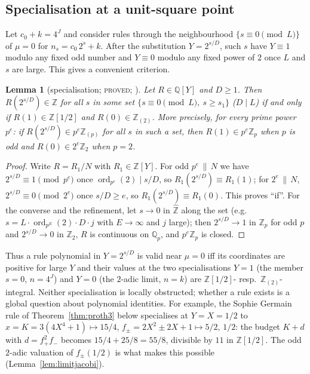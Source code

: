 \documentclass[11pt,reqno]{amsart}
\newtheorem{lemma}[theorem]{Lemma}
\theoremstyle{definition}
\newcommand{\Z}{\mathbb Z}
\newcommand{\Q}{\mathbb Q}
\newcommand{\Zh}{\widehat{\Z}}
\newcommand{\ord}{\operatorname{ord}}
\newcommand{\status}[1]{\textup{\textsc{#1}}}
\begin{document}
\subsection{Specialisation at a unit-square point}
Let $c_0+k=4^J$ and consider rules through the neighbourhood
$\{s\equiv0\pmod L\}$ of $\mu=0$ for $n_s=c_0\,2^s+k$.  After the
substitution $Y=2^{s/D}$, such $s$ have $Y\equiv1$ modulo any fixed odd
number and $Y\equiv0$ modulo any fixed power of $2$ once $L$ and $s$ are
large.  This gives a convenient criterion.

\begin{lemma}[specialisation; \status{proved}; {\cite[Lemma~2.1]{MenuLadder}}]\label{lem:special}
Let $R\in\Q[Y]$ and $D\ge1$.  Then $R(2^{s/D})\in\Z$ for all $s$ in some set
$\{s\equiv0\pmod L,\ s\ge s_1\}$ \textup{(}$D\mid L$\textup{)} if and only if
$R(1)\in\Z[1/2]$ and $R(0)\in\Z_{(2)}$.  More precisely, for every prime
power $p^e$: if $R(2^{s/D})\in p^e\Z_{(p)}$ for all $s$ in such a set, then
$R(1)\in p^e\Z_p$ when $p$ is odd and $R(0)\in 2^e\Z_2$ when $p=2$.
\end{lemma}

\begin{proof}
Write $R=R_1/N$ with $R_1\in\Z[Y]$.  For odd $p^e\,\|\,N$ we have
$2^{s/D}\equiv1\pmod{p^e}$ once $\ord_{p^e}(2)\mid s/D$, so
$R_1(2^{s/D})\equiv R_1(1)$; for $2^e\,\|\,N$, $2^{s/D}\equiv0\pmod{2^e}$ once
$s/D\ge e$, so $R_1(2^{s/D})\equiv R_1(0)$.  This proves ``if''.  For the
converse and the refinement, let $s\to0$ in $\Zh$ along the set (e.g.\
$s=L\cdot\ord_{p^E}(2)\cdot D\cdot j$ with $E\to\infty$ and $j$ large); then
$2^{s/D}\to1$ in $\Z_p$ for odd $p$ and $2^{s/D}\to0$ in $\Z_2$, $R$ is
continuous on $\Q_p$, and $p^e\Z_p$ is closed.
\end{proof}

Thus a rule polynomial in $Y=2^{s/D}$ is valid near $\mu=0$ iff its
coordinates are positive for large $Y$ and their values at the two
specialisations $Y=1$ (the member $s=0$, $n=4^J$) and $Y=0$ (the
$2$-adic limit, $n=k$) are $\Z[1/2]$- resp.\ $\Z_{(2)}$-integral.  Neither
specialisation is locally obstructed; whether a rule exists is a global
question about polynomial identities.  For example, the Sophie Germain
rule of Theorem~\ref{thm:proth3} below specialises at $Y=X=1/2$ to
$x=K=3(4X^4+1)\mapsto 15/4$, $f_\pm=2X^2\pm2X+1\mapsto 5/2,\,1/2$: the
budget $K+d$ with $d=f_+^2f_-$ becomes $15/4+25/8=55/8$, divisible by
$11$ in $\Z[1/2]$.  The odd $2$-adic valuation of $f_\pm(1/2)$ is what makes
this possible (Lemma~\ref{lem:limitjacobi}).
\end{document}
